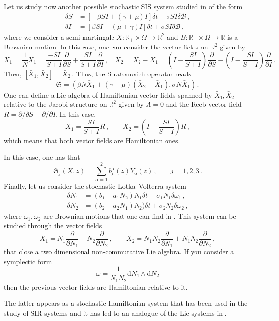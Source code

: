 \documentclass[11pt]{article}
\theoremstyle{plain}
\theoremstyle{definition}
\renewcommand{\d}{\mathrm{d}}
\newcommand{\parder}[2]{\frac{\partial #1}{\partial #2}}
\def\d{\mathrm{d}}
\begin{document}
Let us study now another possible stochastic SIS system studied in \cite{GGHMP11} of the form
\begin{align}
\delta S&=[-\beta SI+(\gamma +\mu)I]\delta t-\sigma SI\delta \mathcal{B}\,,\\
\delta I&=[\beta SI-(\mu+\gamma) I]\delta t+\sigma SI \delta \mathcal{B}\,,
\end{align}
where we consider a semi-martingale $X:\mathbb{R}_+\times \Omega\rightarrow \mathbb{R}^2$ and $B:\mathbb{R}_+\times \Omega\rightarrow \mathbb{R}$ is a Brownian motion. In this case, one can consider the vector fields on $\mathbb{R}^2$ given by
$$
\bar{X}_1= \frac{1}{N}X_1 = \frac{-SI}{S+I}\parder{}{S} + \frac{SI}{S+I}\parder{}{I}\,,\quad \bar{X}_2 = X_2 - \bar X_1 = \left(I - \frac{SI}{S+I}\right)\parder{}{S} - \left(I - \frac{SI}{S+I}\right)\parder{}{I}\,.
$$
Then,
$
[\bar X_1,\bar X_2]=\bar X_2\,.
$
Thus, the Stratonovich operator reads
\begin{equation}
    \mathfrak{S} = (\beta N\bar X_1 + (\gamma + \mu)(\bar X_2 - \bar X_1), \sigma N\bar X_1)\,.
\end{equation}
One can define a Lie algebra of Hamiltonian vector fields spanned by $\bar X_1,\bar X_2$ relative to the Jacobi structure on $\mathbb{R}^2$ given by $\Lambda=0$ and the Reeb vector field $R=\partial/\partial S-\partial/\partial I$. In this case, 
$$
\bar X_1=\frac{SI}{S+I}R\,,\qquad \bar X_2=\left(I-\frac{SI}{S+I}\right)R\,,
$$
which means that both vector fields are Hamiltonian ones.

In this case, one has that
$$
\mathfrak{S}_j(X,z)=\sum_{\alpha=1}^2 b_j^\alpha(z)Y_\alpha(z)\,,\qquad j=1,2,3\,.
$$
Finally, let us consider the stochastic Lotka--Volterra system
\begin{align}
\delta N_1 &= (b_1-a_1N_2)N_1\delta t+\sigma_1 N_1\delta \omega_1\,,\\
\delta N_2 &= (b_2-a_2N_1)N_2)\delta t+\sigma_2N_2\delta \omega_2\,,
\end{align}
where $\omega_1,\omega_2$ are Brownian motions
that one can find in \cite{Ar03}. This system can be studied through the vector fields 
$$
X_1=N_1\frac{\partial}{\partial N_1}+N_2\frac{\partial}{\partial N_2}\,,\qquad X_2=N_1N_2\frac{\partial}{\partial N_1}+N_1N_2\frac{\partial}{\partial N_2}\,,
$$
that close a two dimensional non-commutative Lie algebra. If you consider a symplectic form
$$
\omega=\frac{1}{N_1N_2}\d N_1\wedge \d N_2
$$
then the previous vector fields are Hamiltonian relative to it.

The latter appears as a stochastic Hamiltonian system that has been used in the study of SIR systems \cite{Ar03} and it has led to an analogue of the Lie systems in \cite{CFH23}. 
\end{document}
